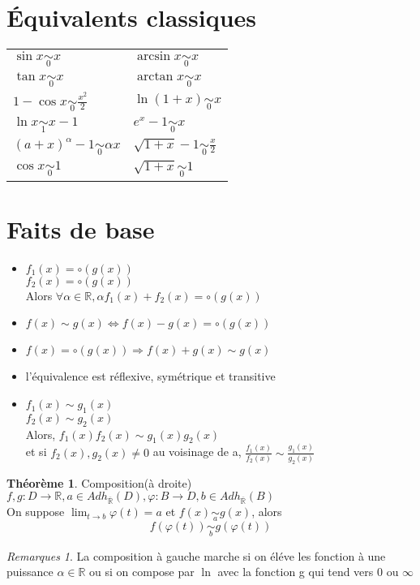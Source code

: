\documentclass[fleqn]{article}
\theoremstyle{definition} \newtheorem*{defi}{D\'efinition}
\theoremstyle{definition} \newtheorem*{theo}{Th\'eor\`eme}
\theoremstyle{remark} \newtheorem*{rqs}{Remarques}
\begin{document}
\section{\'Equivalents classiques}
\begin{tabular}{@{}ll@{}}
		$\sin x \underset{0}{\sim} x$ & $\arcsin x \underset{0}{\sim} x$ \\
		$\tan x \underset{0}{\sim} x$ & $\arctan x \underset{0}{\sim} x$ \\
		$1 - \cos x \underset{0}{\sim} \frac{x^2}{2}$ & $\ln(1+x) \underset{0}{\sim} x$ \\
		$\ln x \underset{1}{\sim} x-1$ & $e^x -1 \underset{0}{\sim} x$ \\
		$(a+x)^{\alpha} -1 \underset{0}{\sim} \alpha x$ & $\sqrt{1+x} - 1 \underset{0}{\sim} \frac{x}{2}$ \\
		$\cos x \underset{0}{\sim} 1$ & $\sqrt{1+x} \underset{0}{\sim} 1$
\end{tabular}

\section{Faits de base}
\begin{itemize}
	\item $f_1(x) = \circ (g(x))$ \\
		$f_2(x)	= \circ (g(x))$ \\
		Alors $\forall \alpha \in \mathbb{R}, \alpha f_1(x) + f_2(x) = \circ (g(x))$
	\item $f(x) \sim g(x) \Leftrightarrow f(x) - g(x) = \circ (g(x))$
	\item $f(x) = \circ(g(x)) \Rightarrow f(x) + g(x) \sim g(x)$
	\item l'\'equivalence est r\'eflexive, sym\'etrique et transitive
	\item $f_1(x) \sim g_1(x)$\\
		$f_2(x) \sim g_2(x)$\\
		Alors, $f_1(x)f_2(x) \sim g_1(x)g_2(x)$ \\et si $f_2(x), g_2(x) \neq 0$ au voisinage de a, $\frac{f_1(x)}{f_2(x)} \sim
		\frac{g_1(x)}{g_2(x)}$
\end{itemize}

\begin{theo} Composition(\`a droite)\\
	$f,g: D \rightarrow \mathbb{R}, a \in Adh_{\overline{\mathbb{R}}}(D), \varphi: B \rightarrow D, b \in Adh_{\overline{\mathbb{R}}}(B)$ \\
	On suppose $\lim_{t \to b}\varphi(t) = a$ et $f(x)\underset{a}{\sim} g(x)$, alors
	\[f(\varphi(t))\underset{b}{\sim} g(\varphi(t))\]

\end{theo}

\begin{rqs}
	La composition \`a gauche marche si on \'el\'eve les fonction \`a une puissance $\alpha \in \mathbb{R}$ ou si on compose par $\ln$ avec la
	fonction g qui tend vers $0$ ou $\infty$
\end{rqs}
\end{document}
